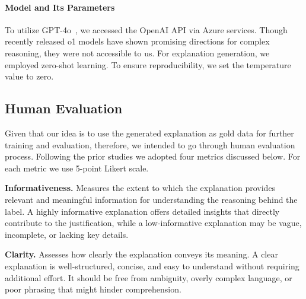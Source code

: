 \paragraph{Model and Its Parameters}
To utilize GPT-4o~\cite{openai2023gpt4}, we accessed the OpenAI API via Azure services. Though recently released o1 models have shown promising directions for complex reasoning, they were not accessible to us. For explanation generation, we employed zero-shot learning. To ensure reproducibility, we set the temperature value to zero.


\subsection{Human Evaluation}
\label{ssec:human_eval}
Given that our idea is to use the generated explanation as gold data for further training and evaluation, therefore, we intended to go through human evaluation process. Following the prior studies \cite{wang_evaluating_2023,huang_chain_2023,agarwal_faithfulness_2024} we adopted four metrics discussed below. For each metric we use 5-point Likert scale. 

\noindent
\textbf{Informativeness.} Measures the extent to which the explanation provides relevant and meaningful information for understanding the reasoning behind the label. A highly informative explanation offers detailed insights that directly contribute to the justification, while a low-informative explanation may be vague, incomplete, or lacking key details.

\noindent
\textbf{Clarity.} Assesses how clearly the explanation conveys its meaning. A clear explanation is well-structured, concise, and easy to understand without requiring additional effort. It should be free from ambiguity, overly complex language, or poor phrasing that might hinder comprehension.

